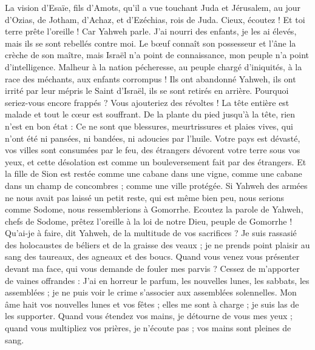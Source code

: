 \begin{multicols}{2}
\VerseOne{}La vision d'Esaïe, fils d'Amots, qu'il a vue touchant Juda et Jérusalem, au jour d'Ozias, de Jotham, d'Achaz, et d'Ezéchias, rois de Juda.
Cieux, écoutez ! Et toi terre prête l'oreille ! Car Yahweh parle. J'ai nourri des enfants, je les ai élevés, mais ils se sont rebellés contre moi.
Le bœuf connaît son possesseur et l'âne la crèche de son maître, mais Israël n'a point de connaissance, mon peuple n'a point d'intelligence.
Malheur à la nation pécheresse, au peuple chargé d'iniquités, à la race des méchants, aux enfants corrompus ! Ils ont abandonné Yahweh, ils ont irrité par leur mépris le Saint d'Israël, ils se sont retirés en arrière.
Pourquoi seriez-vous encore frappés ? Vous ajouteriez des révoltes ! La tête entière est malade et tout le cœur est souffrant.
De la plante du pied jusqu'à la tête, rien n'est en bon état : Ce ne sont que blessures, meurtrissures et plaies vives, qui n'ont été ni pansées, ni bandées, ni adoucies par l'huile.
Votre pays est dévasté, vos villes sont consumées par le feu, des étrangers dévorent votre terre sous vos yeux, et cette désolation est comme un bouleversement fait par des étrangers.
Et la fille de Sion est restée comme une cabane dans une vigne, comme une cabane dans un champ de concombres ; comme une ville protégée.
Si Yahweh des armées ne nous avait pas laissé un petit reste, qui est même bien peu, nous serions comme Sodome, nous ressemblerions à Gomorrhe.
Ecoutez la parole de Yahweh, chefs de Sodome, prêtez l'oreille à la loi de notre Dieu, peuple de Gomorrhe !
Qu'ai-je à faire, dit Yahweh, de la multitude de vos sacrifices ? Je suis rassasié des holocaustes de béliers et de la graisse des veaux ; je ne prends point plaisir au sang des taureaux, des agneaux et des boucs.
Quand vous venez vous présenter devant ma face, qui vous demande de fouler mes parvis ?
Cessez de m'apporter de vaines offrandes : J'ai en horreur le parfum, les nouvelles lunes, les sabbats, les assemblées ; je ne puis voir le crime s'associer aux assemblées solennelles.
Mon âme hait vos nouvelles lunes et vos fêtes ; elles me sont à charge ; je suis las de les supporter.
Quand vous étendez vos mains, je détourne de vous mes yeux ; quand vous multipliez vos prières, je n'écoute pas ; vos mains sont pleines de sang.

\end{multicols}
